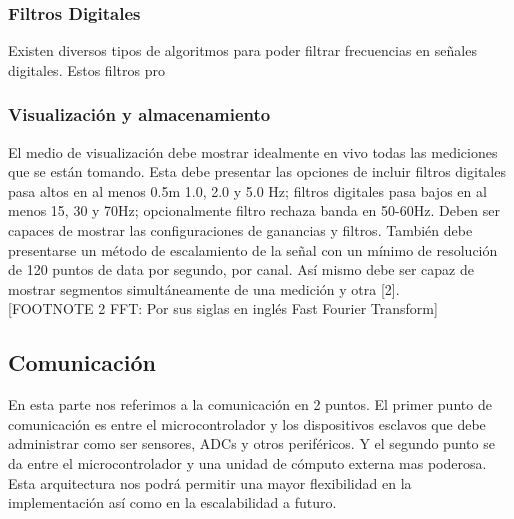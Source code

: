 \subsubsection{Filtros Digitales}
\label{sec:orga16fea4}
Existen diversos tipos de algoritmos para poder filtrar frecuencias en señales digitales. Estos filtros pro\\

\subsubsection{Visualización y almacenamiento}
\label{sec:orgfb88c4a}
El medio de visualización debe mostrar idealmente en vivo todas las mediciones que se están tomando. Esta debe presentar las opciones de incluir filtros digitales pasa altos en al menos 0.5m 1.0, 2.0 y 5.0 Hz; filtros digitales pasa bajos en al menos 15, 30 y 70Hz; opcionalmente filtro rechaza banda en 50-60Hz. Deben ser capaces de mostrar las configuraciones de ganancias y filtros. También debe presentarse un método de escalamiento de la señal con un mínimo de resolución de 120 puntos de data por segundo, por canal. Así mismo debe ser capaz de mostrar segmentos simultáneamente de una medición y otra [2].\\

[FOOTNOTE 2 FFT: Por sus siglas en inglés Fast Fourier Transform]\\

\subsection{Comunicación}
\label{sec:orge7cfc9a}
En esta parte nos referimos a la comunicación en 2 puntos. El primer punto de comunicación es entre el microcontrolador y los dispositivos esclavos que debe administrar como ser sensores, ADCs y otros periféricos. Y el segundo punto se da entre el microcontrolador y una unidad de cómputo externa mas poderosa. Esta arquitectura nos podrá permitir una mayor flexibilidad en la implementación así como en la escalabilidad a futuro.\\

